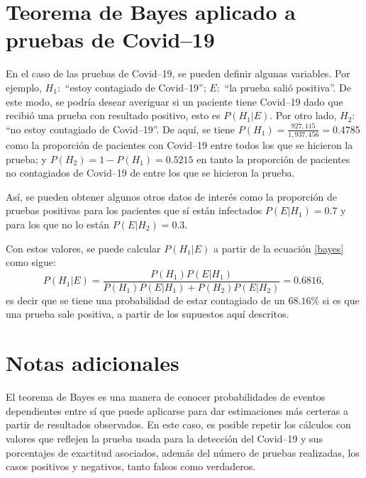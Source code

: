 \documentclass[paper=leter, fontsize=11pt]{scrartcl}
\numberwithin{equation}{section}		%
\numberwithin{figure}{section}			%
\numberwithin{table}{section}				%
\begin{document}
\section{Teorema de Bayes aplicado a pruebas de Covid--19}
En el caso de las pruebas de Covid--19, se pueden definir algunas variables. Por ejemplo, $H_1:$ ``estoy contagiado de Covid--19''; $E:$ ``la prueba salió positiva''. De este modo, se podría desear averiguar si un paciente tiene Covid--19 dado que recibió una prueba con resultado positivo, esto es $P(H_1|E)$. Por otro lado, $H_2:$ ``no estoy contagiado de Covid--19''. De aquí, se tiene $P(H_1) = \frac{927,115}{1,937,456} = 0.4785$ como la proporción de pacientes con Covid--19 entre todos los que se hicieron la prueba; y $P(H_2) = 1 - P(H_1) = 0.5215$ en tanto la proporción de pacientes no contagiados de Covid--19 de entre los que se hicieron la prueba.

Así, se pueden obtener algunos otros datos de interés como la proporción de pruebas positivas para los pacientes que sí están infectados $P(E | H_1) = 0.7$ y para los que no lo están $P(E | H_2) = 0.3$.

Con estos valores, se puede calcular $P(H_1 | E)$ a partir de la ecuación \ref{bayes} como sigue:
\begin{equation*}
    P(H_1 | E) = \frac{P(H_1) P(E|H_1)}{P(H_1) P(E|H_1) + P(H_2) P(E|H_2)} = 0.6816,
\end{equation*}
es decir que se tiene una probabilidad de estar contagiado de un $68.16\%$ si es que una prueba sale positiva, a partir de los supuestos aquí descritos.

\section{Notas adicionales}
El teorema de Bayes es una manera de conocer probabilidades de eventos dependientes entre sí que puede aplicarse para dar estimaciones más certeras a partir de resultados observados. En este caso, es posible repetir los cálculos con valores que reflejen la prueba usada para la detección del Covid--19 y sus porcentajes de exactitud asociados, además del número de pruebas realizadas, los casos positivos y negativos, tanto falsos como verdaderos.



\end{document}
